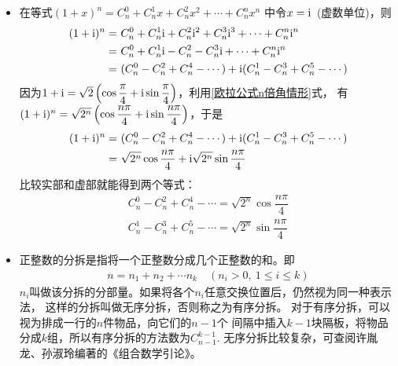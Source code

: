 \begin{itemize}[leftmargin=\inteval{\myitemleftmargin}pt,itemsep=
   \inteval{\myitemitempsep}pt,topsep=\inteval{\myitemtopsep}pt]
\item 在等式$ (1+x)^n=C_n^0+C_n^1x+C_n^2x^2+\cdots + C_n^nx^n $
中令$ x=\mathrm{i} $\ (虚数单位)，则
\begin{align*}
    (1+\mathrm{i})^n=&\ C_n^0+C_n^1\mathrm{i}+C_n^2\mathrm{i}^2+C_n^3\mathrm{i}^3+
    \cdots + C_n^n\mathrm{i}^n  \\
    =&\ C_n^0+C_n^1\mathrm{i}-C_n^2-C_n^3\mathrm{i}+
    \cdots + C_n^n\mathrm{i}^n  \\
    =&\ (C_n^0-C_n^2+C_n^4-\cdots)+\mathrm{i} (C_n^1-C_n^3+C_n^5-\cdots)
\end{align*}
因为$ 1+\mathrm{i}=\sqrt{2}\left(\cos\dfrac{\pi}{4}+
\mathrm{i}\sin\dfrac{\pi}{4}\right) $，利用\eqref{欧拉公式n倍角情形}式，
有$ (1+\mathrm{i})^{n}=\sqrt{2^{n}}\left(\cos\dfrac{n\pi}{4}
+\mathrm{i}\sin\dfrac{n\pi}{4}\right) $，于是
\begin{align*}
    (1+\mathrm{i})^{n}
    =&\ (C_n^0-C_n^2+C_n^4-\cdots)+\mathrm{i} (C_n^1-C_n^3+C_n^5-\cdots)\\
    =&\ \sqrt{2^{n}}\cos\dfrac{n\pi}{4}
    +\mathrm{i}\sqrt{2^{n}}\sin\dfrac{n\pi}{4}
\end{align*}
比较实部和虚部就能得到两个等式：
\begin{gather*}
    C_n^0-C_n^2+C_n^4-\cdots=\sqrt{2^{n}}\cos\dfrac{n\pi}{4} \\
    C_n^1-C_n^3+C_n^5-\cdots=\sqrt{2^{n}}\sin\dfrac{n\pi}{4}
\end{gather*}

\item 正整数的分拆是指将一个正整数分成几个正整数的和。即
\begin{align*}
    n=n_1+n_2+\cdots n_k \quad (n_i>0,\ 1\leq i\leq k)
\end{align*}
$ n_i $叫做该分拆的分部量。如果将各个$ n_i $任意交换位置后，仍然视为同一种表示法，
这样的分拆叫做无序分拆，否则称之为有序分拆。
对于有序分拆，可以视为排成一行的$ n $件物品，向它们的$ n-1 $个
间隔中插入$ k-1 $块隔板，将物品分成$ k $组，所以有序分拆的方法数为$ C_{n-1}^{k-1} $. 
无序分拆比较复杂，可查阅许胤龙、孙淑玲编著的《组合数学引论》。


\end{itemize}
